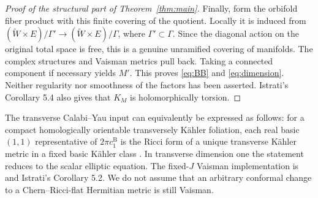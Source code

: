 \documentclass[12pt]{amsart}
\theoremstyle{definition}
\theoremstyle{remark}
\numberwithin{equation}{section}
\newcommand{\bas}{\mathrm{B}}
\begin{document}
\begin{proof}[Proof of the structural part of Theorem~\ref{thm:main}]
Finally, form the orbifold fiber product with this finite covering of
the quotient. Locally it is induced from
$(\widetilde W\times E)/\Gamma'\to(\widetilde W\times E)/\Gamma$,
where $\Gamma'\subset\Gamma$. Since the diagonal action on the original
total space is free, this is a genuine unramified covering of manifolds.
The complex structures and Vaisman metrics pull back. Taking a connected
component if necessary yields $M'$. This proves \eqref{eq:BB} and
\eqref{eq:dimension}. Neither regularity nor smoothness of the factors
has been asserted. Istrati's Corollary 5.4 also gives that $K_M$ is
holomorphically torsion.
\end{proof}

The transverse Calabi--Yau input can equivalently be expressed as follows:
for a compact homologically orientable transversely K\"ahler foliation,
each real basic $(1,1)$ representative of $2\pi c_1^{\bas}$ is the
Ricci form of a unique transverse K\"ahler metric in a fixed basic
K\"ahler class \cite[Section 3.5.5]{EK}. In transverse dimension one the
statement reduces to the scalar elliptic equation. The fixed-$J$
Vaisman implementation is \cite[Theorem 4.1, Lemma 4.2]{OV} and
Istrati's Corollary 5.2. We do not assume that an arbitrary conformal
change to a Chern--Ricci-flat Hermitian metric is still Vaisman.
\end{document}
